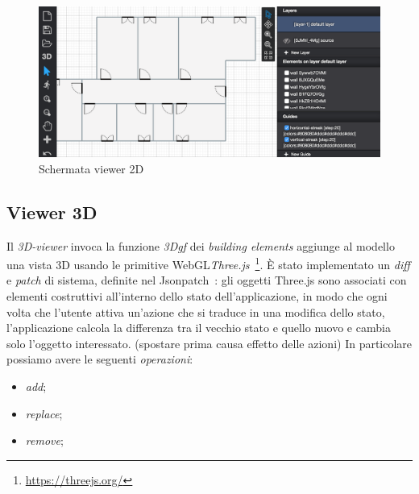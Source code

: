 
\begin{figure}[htbp] %
   \centering
   \includegraphics[width=1\linewidth]{images/2d}
   \caption{Schermata viewer 2D}
   \label{fig:view2D}
\end{figure}
\newpage


\subsection{Viewer 3D}
Il \emph{3D-viewer} invoca la funzione \emph{3Dgf} dei \emph{building elements} aggiunge al modello una vista 3D usando
le primitive WebGL\emph{Three.js}~\footnote{\url{https://threejs.org/}}. \`E stato implementato un \emph{diff} e \emph{patch} di
sistema, definite nel Jsonpatch~\cite{rfc6902}: gli oggetti Three.js sono associati con elementi costruttivi all'interno
dello stato dell'applicazione, in modo che ogni volta che l'utente attiva un'azione che si traduce in una modifica dello stato,
l'applicazione calcola la differenza tra il vecchio stato e quello nuovo e cambia solo l'oggetto interessato.
(spostare prima causa effetto delle azioni)
In particolare possiamo avere le seguenti \textit{operazioni}:
\begin{itemize}
  \item \emph{add};
  \item \emph{replace};
  \item \emph{remove};
\end{itemize}

